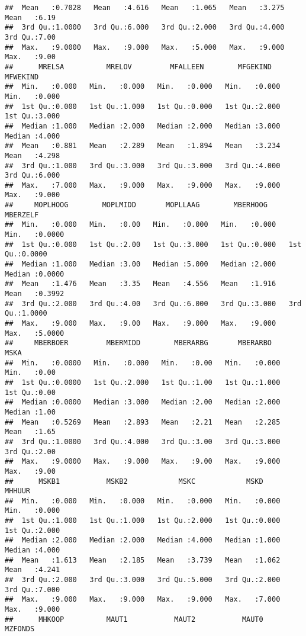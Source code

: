 \documentclass{article}\usepackage[]{graphicx}\usepackage[]{xcolor}
\makeatletter
\newenvironment{kframe}{%
 \def\at@end@of@kframe{}%
 \ifinner\ifhmode%
  \def\at@end@of@kframe{\end{minipage}}%
  \begin{minipage}{\columnwidth}%
 \fi\fi%
 \def\FrameCommand##1{\hskip\@totalleftmargin \hskip-\fboxsep
 \colorbox{shadecolor}{##1}\hskip-\fboxsep
     \hskip-\linewidth \hskip-\@totalleftmargin \hskip\columnwidth}%
 \MakeFramed {\advance\hsize-\width
   \@totalleftmargin\z@ \linewidth\hsize
   \@setminipage}}%
 {\par\unskip\endMakeFramed%
 \at@end@of@kframe}
\newenvironment{knitrout}{}{} %
\makeatother
\begin{document}
\begin{knitrout}
\begin{kframe}
\begin{verbatim}
##  Mean   :0.7028   Mean   :4.616   Mean   :1.065   Mean   :3.275   Mean   :6.19  
##  3rd Qu.:1.0000   3rd Qu.:6.000   3rd Qu.:2.000   3rd Qu.:4.000   3rd Qu.:7.00  
##  Max.   :9.0000   Max.   :9.000   Max.   :5.000   Max.   :9.000   Max.   :9.00  
##      MRELSA          MRELOV         MFALLEEN        MFGEKIND        MFWEKIND    
##  Min.   :0.000   Min.   :0.000   Min.   :0.000   Min.   :0.000   Min.   :0.000  
##  1st Qu.:0.000   1st Qu.:1.000   1st Qu.:0.000   1st Qu.:2.000   1st Qu.:3.000  
##  Median :1.000   Median :2.000   Median :2.000   Median :3.000   Median :4.000  
##  Mean   :0.881   Mean   :2.289   Mean   :1.894   Mean   :3.234   Mean   :4.298  
##  3rd Qu.:1.000   3rd Qu.:3.000   3rd Qu.:3.000   3rd Qu.:4.000   3rd Qu.:6.000  
##  Max.   :7.000   Max.   :9.000   Max.   :9.000   Max.   :9.000   Max.   :9.000  
##     MOPLHOOG        MOPLMIDD       MOPLLAAG        MBERHOOG        MBERZELF     
##  Min.   :0.000   Min.   :0.00   Min.   :0.000   Min.   :0.000   Min.   :0.0000  
##  1st Qu.:0.000   1st Qu.:2.00   1st Qu.:3.000   1st Qu.:0.000   1st Qu.:0.0000  
##  Median :1.000   Median :3.00   Median :5.000   Median :2.000   Median :0.0000  
##  Mean   :1.476   Mean   :3.35   Mean   :4.556   Mean   :1.916   Mean   :0.3992  
##  3rd Qu.:2.000   3rd Qu.:4.00   3rd Qu.:6.000   3rd Qu.:3.000   3rd Qu.:1.0000  
##  Max.   :9.000   Max.   :9.00   Max.   :9.000   Max.   :9.000   Max.   :5.0000  
##     MBERBOER         MBERMIDD        MBERARBG       MBERARBO          MSKA     
##  Min.   :0.0000   Min.   :0.000   Min.   :0.00   Min.   :0.000   Min.   :0.00  
##  1st Qu.:0.0000   1st Qu.:2.000   1st Qu.:1.00   1st Qu.:1.000   1st Qu.:0.00  
##  Median :0.0000   Median :3.000   Median :2.00   Median :2.000   Median :1.00  
##  Mean   :0.5269   Mean   :2.893   Mean   :2.21   Mean   :2.285   Mean   :1.65  
##  3rd Qu.:1.0000   3rd Qu.:4.000   3rd Qu.:3.00   3rd Qu.:3.000   3rd Qu.:2.00  
##  Max.   :9.0000   Max.   :9.000   Max.   :9.00   Max.   :9.000   Max.   :9.00  
##      MSKB1           MSKB2            MSKC            MSKD           MHHUUR     
##  Min.   :0.000   Min.   :0.000   Min.   :0.000   Min.   :0.000   Min.   :0.000  
##  1st Qu.:1.000   1st Qu.:1.000   1st Qu.:2.000   1st Qu.:0.000   1st Qu.:2.000  
##  Median :2.000   Median :2.000   Median :4.000   Median :1.000   Median :4.000  
##  Mean   :1.613   Mean   :2.185   Mean   :3.739   Mean   :1.062   Mean   :4.241  
##  3rd Qu.:2.000   3rd Qu.:3.000   3rd Qu.:5.000   3rd Qu.:2.000   3rd Qu.:7.000  
##  Max.   :9.000   Max.   :9.000   Max.   :9.000   Max.   :7.000   Max.   :9.000  
##      MHKOOP          MAUT1           MAUT2           MAUT0         MZFONDS     

\end{verbatim}
\end{kframe}
\end{knitrout}
\end{document}
